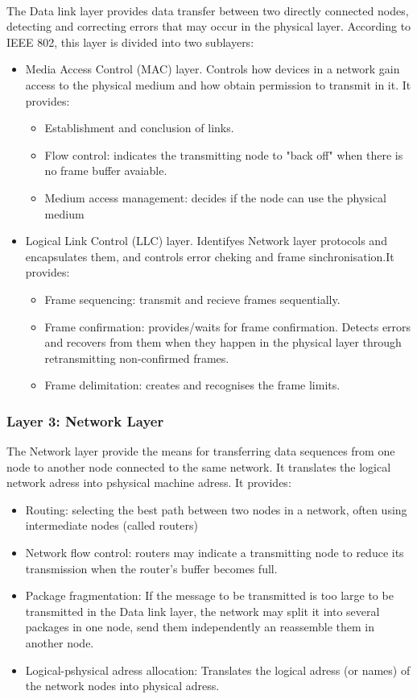 \documentclass[12pt,a4paper]{report}
\begin{document}
\paragraph{}The Data link layer provides data transfer between two directly connected nodes, detecting and correcting errors that may occur in the physical layer. According to IEEE 802, this layer is divided into two sublayers:
\begin{itemize}
\item Media Access Control (MAC) layer. Controls how devices in a network gain access to the physical medium and how obtain permission to transmit in it. It provides:
	\begin{itemize}
	\item Establishment and conclusion of links.
	\item Flow control: indicates the transmitting node to "back off" when there is no frame buffer avaiable.
	\item Medium access management: decides if the node can use the physical medium
	\end{itemize}
\item Logical Link Control (LLC) layer. Identifyes Network layer protocols and encapsulates them, and controls error cheking and frame sinchronisation.It provides:
	\begin{itemize}
	\item Frame sequencing: transmit and recieve frames sequentially.
	\item Frame confirmation: provides/waits for frame confirmation. Detects errors and recovers from them when they happen in the physical layer through retransmitting non-confirmed frames.
	\item Frame delimitation: creates and recognises the frame limits.
	\end{itemize}
\end{itemize}

\subsubsection{Layer 3: Network Layer}
The Network layer provide the means for transferring data sequences from one node to another node connected to the same network. It translates the logical network adress into pshysical machine adress. It provides:
\begin{itemize}
\item Routing: selecting the best path between two nodes in a network, often using intermediate nodes (called routers)
\item Network flow control: routers may indicate a transmitting node to reduce its transmission when the router's buffer becomes full.
\item Package fragmentation: If the message to be transmitted is too large to be transmitted in the Data link layer, the network may split it into several packages in one node, send them independently an reassemble them in another node.
\item Logical-pshysical adress allocation: Translates the logical adress (or names) of the network nodes into physical adress.
\end{itemize}
\end{document}
